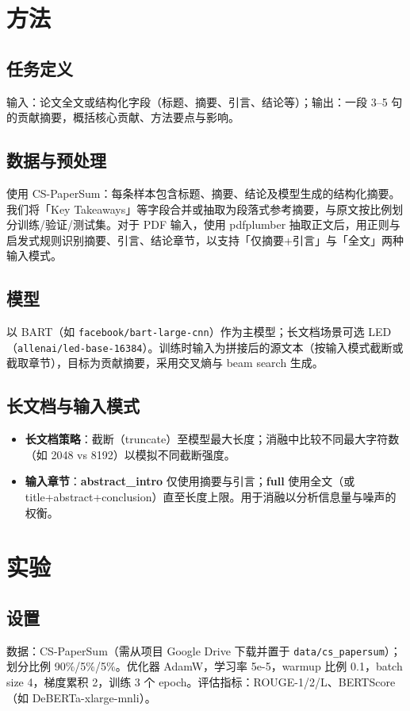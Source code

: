 \documentclass[11pt,a4paper]{article}
\begin{document}
\section{方法}
\label{sec:method}

\subsection{任务定义}
输入：论文全文或结构化字段（标题、摘要、引言、结论等）；输出：一段 3--5 句的贡献摘要，概括核心贡献、方法要点与影响。

\subsection{数据与预处理}
使用 CS-PaperSum：每条样本包含标题、摘要、结论及模型生成的结构化摘要。我们将「Key Takeaways」等字段合并或抽取为段落式参考摘要，与原文按比例划分训练/验证/测试集。对于 PDF 输入，使用 pdfplumber 抽取正文后，用正则与启发式规则识别摘要、引言、结论章节，以支持「仅摘要+引言」与「全文」两种输入模式。

\subsection{模型}
以 BART（如 \texttt{facebook/bart-large-cnn}）作为主模型；长文档场景可选 LED（\texttt{allenai/led-base-16384}）。训练时输入为拼接后的源文本（按输入模式截断或截取章节），目标为贡献摘要，采用交叉熵与 beam search 生成。

\subsection{长文档与输入模式}
\begin{itemize}
  \item \textbf{长文档策略}：截断（truncate）至模型最大长度；消融中比较不同最大字符数（如 2048 vs 8192）以模拟不同截断强度。
  \item \textbf{输入章节}：\textbf{abstract\_intro} 仅使用摘要与引言；\textbf{full} 使用全文（或 title+abstract+conclusion）直至长度上限。用于消融以分析信息量与噪声的权衡。
\end{itemize}

\section{实验}
\label{sec:exp}

\subsection{设置}
数据：CS-PaperSum（需从项目 Google Drive 下载并置于 \texttt{data/cs\_papersum}）；划分比例 90\%/5\%/5\%。优化器 AdamW，学习率 5e-5，warmup 比例 0.1，batch size 4，梯度累积 2，训练 3 个 epoch。评估指标：ROUGE-1/2/L、BERTScore（如 DeBERTa-xlarge-mnli）。
\end{document}
